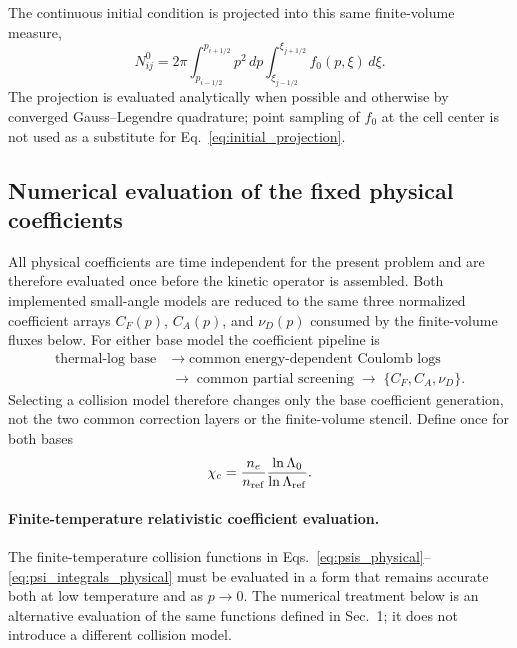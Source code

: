 \documentclass[11pt]{article}
\begin{document}
The continuous initial condition is projected into this same finite-volume measure,
\begin{equation}
 N_{ij}^{0}
 =2\pi\int_{p_{i-1/2}}^{p_{i+1/2}}p^2\,dp
       \int_{\xi_{j-1/2}}^{\xi_{j+1/2}}f_0(p,\xi)\,d\xi.
 \label{eq:initial_projection}
\end{equation}
The projection is evaluated analytically when possible and otherwise by converged
Gauss--Legendre quadrature; point sampling of $f_0$ at the cell center is not used as
a substitute for Eq.~\eqref{eq:initial_projection}.

\subsection{Numerical evaluation of the fixed physical coefficients}

All physical coefficients are time independent for the present problem and are therefore
evaluated once before the kinetic operator is assembled.  Both implemented small-angle
models are reduced to the same three normalized coefficient arrays $C_F(p)$, $C_A(p)$,
and $\nu_D(p)$ consumed by the finite-volume fluxes below.  For either base model the
coefficient pipeline is
\begin{equation}
 \begin{aligned}
 \text{thermal-log base}
 &\;\longrightarrow\;\text{common energy-dependent Coulomb logs}\\
 &\;\longrightarrow\;\text{common partial screening}
 \;\longrightarrow\;\{C_F,C_A,\nu_D\}.
 \end{aligned}
 \label{eq:collision_layer_pipeline}
\end{equation}
Selecting a collision model therefore changes only the base coefficient generation, not
the two common correction layers or the finite-volume stencil.  Define once for both
bases
\begin{equation}
 \chi_c=\frac{n_e}{n_{\rm ref}}
        \frac{\ln\Lambda_0}{\ln\Lambda_{\rm ref}}.
 \label{eq:common_collision_scaling}
\end{equation}

\paragraph{Finite-temperature relativistic coefficient evaluation.}
The finite-temperature collision functions in
Eqs.~\eqref{eq:psis_physical}--\eqref{eq:psi_integrals_physical} must be evaluated in a
form that remains accurate both at low temperature and as $p\rightarrow0$.  The
numerical treatment below is an alternative evaluation of the same functions defined in
Sec.~1; it does not introduce a different collision model.
\end{document}
